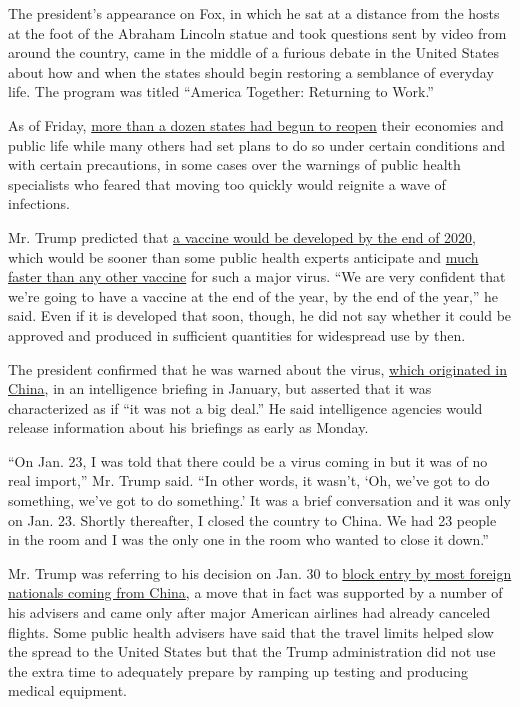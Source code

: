 The president's appearance on Fox, in which he sat at a distance from
the hosts at the foot of the Abraham Lincoln statue and took questions
sent by video from around the country, came in the middle of a furious
debate in the United States about how and when the states should begin
restoring a semblance of everyday life. The program was titled ``America
Together: Returning to Work.''

As of Friday,
\href{https://www.nytimes3xbfgragh.onion/interactive/2020/us/states-reopen-map-coronavirus.html}{more
than a dozen states had begun to reopen} their economies and public life
while many others had set plans to do so under certain conditions and
with certain precautions, in some cases over the warnings of public
health specialists who feared that moving too quickly would reignite a
wave of infections.

Mr. Trump predicted that
\href{https://www.nytimes3xbfgragh.onion/2020/05/02/us/politics/vaccines-coronavirus-research.html}{a
vaccine would be developed by the end of 2020}, which would be sooner
than some public health experts anticipate and
\href{https://www.nytimes3xbfgragh.onion/2020/04/18/health/coronavirus-america-future.html}{much
faster than any other vaccine} for such a major virus. ``We are very
confident that we're going to have a vaccine at the end of the year, by
the end of the year,'' he said. Even if it is developed that soon,
though, he did not say whether it could be approved and produced in
sufficient quantities for widespread use by then.

The president confirmed that he was warned about the virus,
\href{https://www.nytimes3xbfgragh.onion/2020/05/03/world/europe/backlash-china-coronavirus.html}{which
originated in China}, in an intelligence briefing in January, but
asserted that it was characterized as if ``it was not a big deal.'' He
said intelligence agencies would release information about his briefings
as early as Monday.

``On Jan. 23, I was told that there could be a virus coming in but it
was of no real import,'' Mr. Trump said. ``In other words, it wasn't,
`Oh, we've got to do something, we've got to do something.' It was a
brief conversation and it was only on Jan. 23. Shortly thereafter, I
closed the country to China. We had 23 people in the room and I was the
only one in the room who wanted to close it down.''

Mr. Trump was referring to his decision on Jan. 30 to
\href{https://www.nytimes3xbfgragh.onion/2020/01/31/business/china-travel-coronavirus.html}{block
entry by most foreign nationals coming from China}, a move that in fact
was supported by a number of his advisers and came only after major
American airlines had already canceled flights. Some public health
advisers have said that the travel limits helped slow the spread to the
United States but that the Trump administration did not use the extra
time to adequately prepare by ramping up testing and producing medical
equipment.

